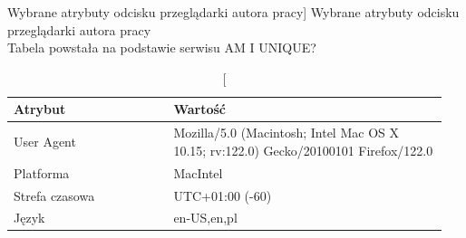 \begin{table}[p]
    \small
    \centering
    \caption
        [Wybrane atrybuty odcisku przeglądarki autora pracy]
        {Wybrane atrybuty odcisku przeglądarki autora pracy\\Tabela powstała na podstawie serwisu AM I UNIQUE?\cite{am-i-unique}}
    \begin{tabular}{|p{0.35\linewidth} | p{0.6\linewidth}|}
        \hline
        \textbf{Atrybut}             & \textbf{Wartość}                                                                                                                                                                                                                                                                                                                                                                                                                              \\ \hline
        User Agent                   & Mozilla/5.0 (Macintosh; Intel Mac OS X 10.15; rv:122.0) Gecko/20100101 Firefox/122.0                                                                                                                                                                                                                                                                                                                                                          \\ \hline
        Platforma                    & MacIntel                                                                                                                                                                                                                                                                                                                                                                                                                                      \\ \hline
        Strefa czasowa               & UTC+01:00 (-60)                                                                                                                                                                                                                                                                                                                                                                                                                               \\ \hline
        Język                        & en-US,en,pl                                                                                                                                                                                                                                                                                                                                                                                                                                   \\ \hline

\end{tabular}
\end{table}
